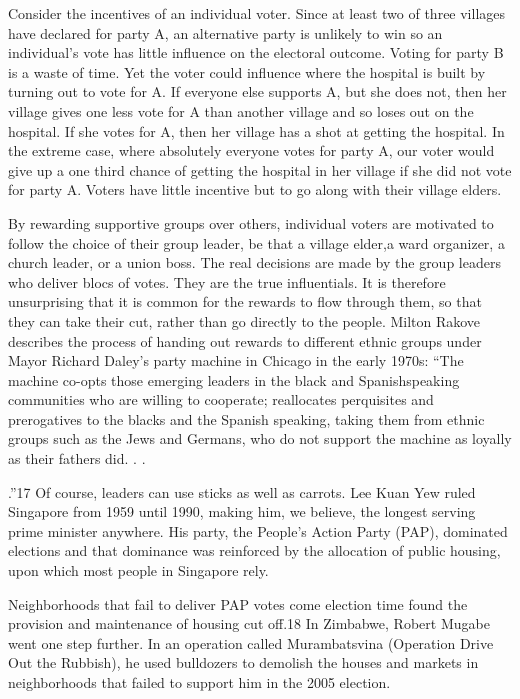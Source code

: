 \documentclass[10pt]{article}
\begin{document}
{\large Consider the incentives of an individual voter. Since at least two of
three villages have declared for party A, an alternative party is unlikely to win
so an individual's vote has little influence on the electoral outcome. Voting for
party B is a waste of time. Yet the voter could influence where the hospital is
built by turning out to vote for A. If everyone else supports A, but she does
not, then her village gives one less vote for A than another village and so loses
out on the hospital. If she votes for A, then her village has a shot at getting
the hospital. In the extreme case, where absolutely everyone votes for party A,
our voter would give up a one third chance of getting the hospital in her village
if she did not vote for party A. Voters have little incentive but to go along
with their village elders.}

{\large By rewarding supportive groups over others, individual voters are
motivated to follow the choice of their group leader, be that a village elder,a
ward organizer, a church leader, or a union boss. The real decisions are made by
the group leaders who deliver blocs of votes. They are the true influentials. It
is therefore unsurprising that it is common for the rewards to flow through them,
so that they can take their cut, rather than go directly to the people. Milton
Rakove describes the process of handing out rewards to different ethnic groups
under Mayor Richard Daley's party machine in Chicago in the early 1970s: ``The
machine co-opts those emerging leaders in the black and Spanishspeaking
communities who are willing to cooperate; reallocates perquisites and
prerogatives to the blacks and the Spanish speaking, taking them from ethnic
groups such as the Jews and Germans, who do not support the machine as loyally as
their fathers did. . .}

{\large .''17 Of course, leaders can use sticks as well as carrots. Lee Kuan Yew
ruled Singapore from 1959 until 1990, making him, we believe, the longest serving
prime minister anywhere. His party, the People's Action Party (PAP), dominated
elections and that dominance was reinforced by the allocation of public housing,
upon which most people in Singapore rely.}

{\large Neighborhoods that fail to deliver PAP votes come election time found
the provision and maintenance of housing cut off.18 In Zimbabwe, Robert Mugabe
went one step further. In an operation called Murambatsvina (Operation Drive Out
the Rubbish), he used bulldozers to demolish the houses and markets in
neighborhoods that failed to support him in the 2005 election.}
\end{document}
